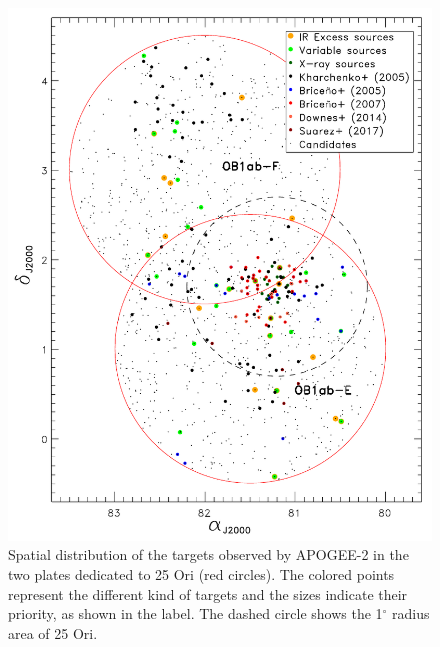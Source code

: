 \documentclass[12pt]{article}
\begin{document}
\begin{figure}%
	\centering
	\includegraphics[width=1.\textwidth]{sky_APOGEE-2.pdf}
	\caption[Spatial distribution of the targets observed by APOGEE-2 in 25 Ori]{Spatial distribution of the targets observed by APOGEE-2 in the two plates dedicated to 25 Ori (red circles). The colored points represent the different kind of targets and the sizes indicate their priority, as shown in the label. The dashed circle shows the 1$^\circ$ radius area of 25 Ori.}
	\label{fig_APOGEE-2:sky}
\end{figure}
\end{document}
